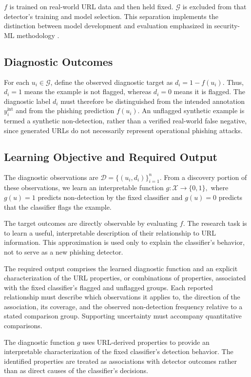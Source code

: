 \documentclass[sigconf]{acmart}
\begin{document}
\begin{bibunit}
$f$ is trained on real-world URL data and then held fixed. $\mathcal{G}$ is excluded from that detector's training and model selection. This separation implements the distinction between model development and evaluation emphasized in security-ML methodology \cite{arp2022dos}.


\subsection{Diagnostic Outcomes}

For each $u_i \in \mathcal{G}$, define the observed diagnostic target as $d_i = 1 - f(u_i).$ Thus, $d_i=1$ means the example is not flagged, whereas $d_i=0$ means it is flagged. The diagnostic label $d_i$ must therefore be distinguished from the intended annotation $y_i^{\mathrm{int}}$ and from the phishing prediction $f(u_i)$. An unflagged synthetic example is termed a synthetic non-detection, rather than a verified real-world false negative, since generated URLs do not necessarily represent operational phishing attacks.


\subsection{Learning Objective and Required Output}

The diagnostic observations are $\mathcal{D}=\{(u_i,d_i)\}_{i=1}^{n}.$ From a discovery portion of these observations, we learn an interpretable function $g : \mathcal{X} \rightarrow \{0,1\},$ where $g(u)=1$ predicts non-detection by the fixed classifier and $g(u)=0$ predicts that the classifier flags the example.

The target outcomes are directly observable by evaluating $f$. The research task is to learn a useful, interpretable description of their relationship to URL information. This approximation is used only to explain the classifier's behavior, not to serve as a new phishing detector.

The required output comprises the learned diagnostic function and an explicit characterization of the URL properties, or combinations of properties, associated with the fixed classifier's flagged and unflagged groups. Each reported relationship must describe which observations it applies to, the direction of the association, its coverage, and the observed non-detection frequency relative to a stated comparison group. Supporting uncertainty must accompany quantitative comparisons.

The diagnostic function $g$ uses URL-derived properties to provide an interpretable characterization of the fixed classifier's detection behavior. The identified properties are treated as associations with detector outcomes rather than as direct causes of the classifier's decisions.



\end{bibunit}
\end{document}
